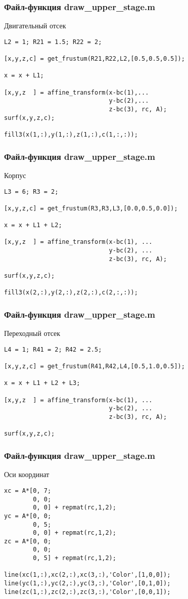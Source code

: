 \documentclass[12pt, compress]{beamer}
\renewcommand{\emph}[1]{\textcolor{dark-blue}{#1}}
\begin{document}
\begin{frame}[c, fragile]
\frametitle{Файл-функция \emph{draw\_upper\_stage.m}}
Двигательный отсек
\begin{lstlisting}
L2 = 1; R21 = 1.5; R22 = 2;

[x,y,z,c] = get_frustum(R21,R22,L2,[0.5,0.5,0.5]);

x = x + L1;

[x,y,z  ] = affine_transform(x-bc(1),...
                             y-bc(2),...
                             z-bc(3), rc, A);
surf(x,y,z,c);

fill3(x(1,:),y(1,:),z(1,:),c(1,:,:));
\end{lstlisting}
\end{frame}

\begin{frame}[c, fragile]
\frametitle{Файл-функция \emph{draw\_upper\_stage.m}}
Корпус
\begin{lstlisting}
L3 = 6; R3 = 2;

[x,y,z,c] = get_frustum(R3,R3,L3,[0.0,0.5,0.0]);

x = x + L1 + L2;

[x,y,z  ] = affine_transform(x-bc(1), ...
                             y-bc(2), ...
                             z-bc(3), rc, A);

surf(x,y,z,c);

fill3(x(2,:),y(2,:),z(2,:),c(2,:,:));

\end{lstlisting}
\end{frame}

\begin{frame}[c, fragile]
\frametitle{Файл-функция \emph{draw\_upper\_stage.m}}
Переходный отсек
\begin{lstlisting}
L4 = 1; R41 = 2; R42 = 2.5;

[x,y,z,c] = get_frustum(R41,R42,L4,[0.5,1.0,0.5]);

x = x + L1 + L2 + L3;

[x,y,z  ] = affine_transform(x-bc(1), ...
                             y-bc(2), ...
                             z-bc(3), rc, A);

surf(x,y,z,c);

\end{lstlisting}
\end{frame}

\begin{frame}[c, fragile]
\frametitle{Файл-функция \emph{draw\_upper\_stage.m}}
Оси координат
\begin{lstlisting}
xc = A*[0, 7;
        0, 0;
        0, 0] + repmat(rc,1,2);
yc = A*[0, 0;
        0, 5;
        0, 0] + repmat(rc,1,2);
zc = A*[0, 0;
        0, 0;
        0, 5] + repmat(rc,1,2);  

line(xc(1,:),xc(2,:),xc(3,:),'Color',[1,0,0]);
line(yc(1,:),yc(2,:),yc(3,:),'Color',[0,1,0]);
line(zc(1,:),zc(2,:),zc(3,:),'Color',[0,0,1]);

\end{lstlisting}
\end{frame}
\end{document}
